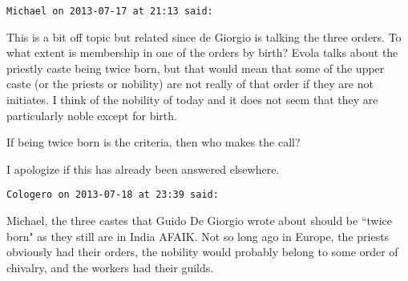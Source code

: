 \begin{footnotesize}
\begin{sffamily}
\texttt{Michael on 2013-07-17 at 21:13 said: }

This is a bit off topic but related since de Giorgio is talking the three orders. To what extent is membership in one of the orders by birth? Evola talks about the priestly caste being twice born, but that would mean that some of the upper caste (or the priests or nobility) are not really of that order if they are not initiates. I think of the nobility of today and it does not seem that they are particularly noble except for birth.

If being twice born is the criteria, then who makes the call? 

I apologize if this has already been answered elsewhere.


\hfill

\texttt{Cologero on 2013-07-18 at 23:39 said: }

Michael, the three castes that Guido De Giorgio wrote about should be ``twice born" as they still are in India AFAIK. Not so long ago in Europe, the priests obviously had their orders, the nobility would probably belong to some order of chivalry, and the workers had their guilds.


\end{sffamily}\end{footnotesize}
